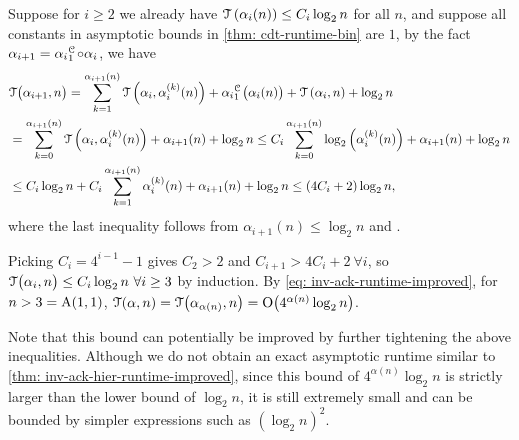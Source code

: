 Suppose for $i\ge 2$ we already have $\mathcal{T}\left(\alpha_i(n)\right) \le C_i\log_2n$ for all $n$, and suppose all constants in asymptotic bounds in \cref{thm: cdt-runtime-bin} are $1$, by the fact $\alpha_{i+1} = \cdt{\alpha_i}{1} \circ \alpha_i$, we have
\begin{equation*}
\begin{aligned}
& \runtime\big(\alpha_{i+1}, n\big) =
\sum_{k=1}^{\alpha_{i+1}(n)} \runtime\left(\alpha_i, \alpha_i^{(k)}(n)\right)
+ \cdt{\alpha_i}{1}\big(\alpha_i(n)\big) + \runtime\left(\alpha_i, n\right) + \log_2 n
\\
& = \sum_{k=0}^{\alpha_{i+1}(n)} \runtime\left(\alpha_i, \alpha_i^{(k)}(n)\right) + \alpha_{i+1}(n) + \log_2 n \le C_i\sum_{k=0}^{\alpha_{i+1}(n)}\log_2 \left(\alpha_i^{(k)}(n)\right) + \alpha_{i+1}(n) + \log_2 n\\
 & \le C_i\log_2n + C_i\sum_{k=1}^{\alpha_{i+1}(n)}\alpha_i^{(k)}(n) + \alpha_{i+1}(n)
 + \log_2 n \le (4C_i+2)\log_2n,
\end{aligned}
\end{equation*}
where the last inequality follows from $\alpha_{i+1}(n)\le \log_2n$ and .

Picking $C_i = 4^{i-1} - 1$ gives $C_2 > 2$ and $C_{i+1} > 4C_i + 2 \ \forall i$, so $\mathcal{T}\big(\alpha_i, n\big) \le C_i\log_2n \ \forall i\ge 3$ by induction. By \eqref{eq: inv-ack-runtime-improved}, for $n > 3 = \text{A}(1, 1)$, $\mathcal{T}(\alpha, n) = \mathcal{T}\big(\alpha_{\alpha(n)}, n\big) = \text{O}\big(4^{\alpha(n)}\log_2n\big)$. 

Note that this bound can potentially be improved by further tightening the above inequalities. Although we do not obtain an exact asymptotic runtime similar to \cref{thm: inv-ack-hier-runtime-improved}, since this bound of $4^{\alpha(n)}\log_2n$ is strictly larger than the lower bound of $\log_2n$, it is still extremely small and can be bounded by simpler expressions such as $(\log_2n)^2$.
